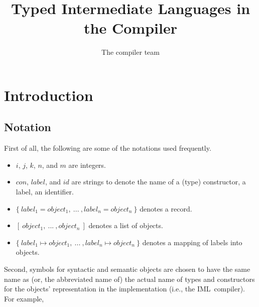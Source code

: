 \documentclass{article}
\title{Typed Intermediate Languages in the \IML Compiler}
\author{The \IML compiler team}
\newcommand{\IML}{IML\ }
\begin{document}
\maketitle
\tableofcontents

\section{Introduction}

\subsection{Notation}

First of all, the following are some of the notations used frequently.
\begin{itemize}
\item $i$, $j$, $k$, $n$, and $m$ are integers.
\item $con$, $label$, and $id$ are strings to denote the name of a
(type) constructor, a label, an identifier. 
\item $\{ \ label_1=object_1, \ ... \ , label_n=object_n \ \}$ denotes
a record.
\item $[ \ object_1, \ ... \ , object_n \ ]$ denotes a list of objects. 
\item $\{ \ label_1 \mapsto object_1, \ ... \ , label_n \mapsto
object_n\ \}$ denotes a mapping of labels into objects.
\end{itemize}

Second, symbols for syntactic and semantic objects are chosen to have
the same name as (or, the abbreviated name of) the actual name of
types and constructors for the objects' representation in the
implementation (i.e., the \IML compiler). For example,
\end{document}
